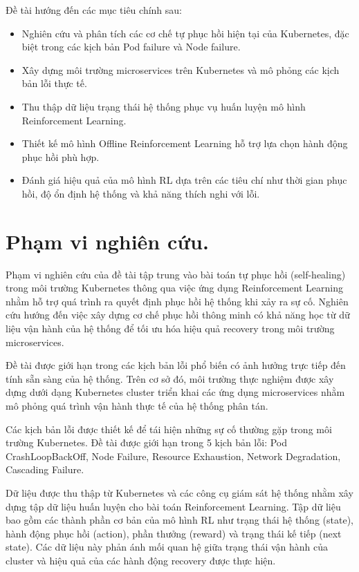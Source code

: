 Đề tài hướng đến các mục tiêu chính sau:
\begin{itemize}
    \item Nghiên cứu và phân tích các cơ chế tự phục hồi hiện tại của Kubernetes, đặc biệt trong các kịch bản Pod failure và Node failure.
    \item Xây dựng môi trường microservices trên Kubernetes và mô phỏng các kịch bản lỗi thực tế.
    \item Thu thập dữ liệu trạng thái hệ thống phục vụ huấn luyện mô hình Reinforcement Learning.
    \item Thiết kế mô hình Offline Reinforcement Learning hỗ trợ lựa chọn hành động phục hồi phù hợp.
    \item Đánh giá hiệu quả của mô hình RL dựa trên các tiêu chí như thời gian phục hồi, độ ổn định hệ thống và khả năng thích nghi với lỗi.
\end{itemize}

\section{Phạm vi nghiên cứu.}


Phạm vi nghiên cứu của đề tài tập trung vào bài toán tự phục hồi (self-healing) trong môi trường Kubernetes thông qua việc ứng dụng Reinforcement Learning nhằm hỗ trợ quá trình ra quyết định phục hồi hệ thống khi xảy ra sự cố. Nghiên cứu hướng đến việc xây dựng cơ chế phục hồi thông minh có khả năng học từ dữ liệu vận hành của hệ thống để tối ưu hóa hiệu quả recovery trong môi trường microservices.

Đề tài được giới hạn trong các kịch bản lỗi phổ biến có ảnh hưởng trực tiếp đến tính sẵn sàng của hệ thống. Trên cơ sở đó, môi trường thực nghiệm được xây dựng dưới dạng Kubernetes cluster triển khai các ứng dụng microservices nhằm mô phỏng quá trình vận hành thực tế của hệ thống phân tán.

Các kịch bản lỗi được thiết kế để tái hiện những sự cố thường gặp trong môi trường Kubernetes. Đề tài được giới hạn trong 5 kịch bản lỗi: Pod CrashLoopBackOff, Node Failure, Resource Exhaustion, Network Degradation, Cascading Failure.

Dữ liệu được thu thập từ Kubernetes và các công cụ giám sát hệ thống nhằm xây dựng tập dữ liệu huấn luyện cho bài toán Reinforcement Learning. Tập dữ liệu bao gồm các thành phần cơ bản của mô hình RL như trạng thái hệ thống (state), hành động phục hồi (action), phần thưởng (reward) và trạng thái kế tiếp (next state). Các dữ liệu này phản ánh mối quan hệ giữa trạng thái vận hành của cluster và hiệu quả của các hành động recovery được thực hiện.

